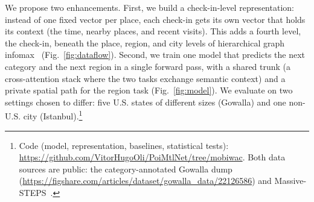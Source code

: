 We propose two enhancements. First, we build a check-in-level representation: instead of one fixed vector per place, each check-in gets its own vector that holds its context (the time, nearby places, and recent visits).
This adds a fourth level, the check-in, beneath the place, region, and city levels of hierarchical graph infomax~\cite{huang2023hgi,velickovic2019dgi} (Fig.~\ref{fig:dataflow}). Second, we train one model that
predicts the next category and the next region in a single forward pass, with a shared trunk (a cross-attention stack where the two tasks exchange
semantic context) and a private spatial path for the region task (Fig.~\ref{fig:model}). We evaluate on two settings chosen to differ: five U.S. states of different sizes (Gowalla) and one non-U.S. city (Istanbul).\footnote{\label{fn:code}Code (model, representation, baselines, statistical tests): \url{https://github.com/VitorHugoOli/PoiMtlNet/tree/mobiwac}. Both data sources are public: the category-annotated Gowalla dump (\url{https://figshare.com/articles/dataset/gowalla_data/22126586}) and Massive-STEPS~\cite{wongso2025massivesteps}.}

